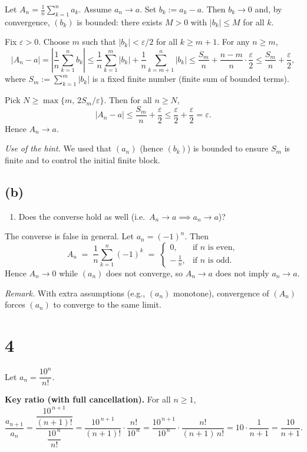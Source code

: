 \documentclass[12pt,a4paper]{article}
\theoremstyle{definition}
\theoremstyle{remark}
\begin{document}
Let \(A_n=\frac{1}{n}\sum_{k=1}^n a_k\). Assume \(a_n \to a\). Set \(b_k:=a_k-a\). Then \(b_k \to 0\) and, by convergence, \((b_k)\) is bounded: there exists \(M>0\) with \(|b_k|\le M\) for all \(k\).

Fix \(\varepsilon>0\). Choose \(m\) such that \(|b_k|<\varepsilon/2\) for all \(k\ge m+1\). For any \(n\ge m\),
\[
|A_n-a|
= \left|\frac{1}{n}\sum_{k=1}^n b_k\right|
\le \frac{1}{n}\sum_{k=1}^m |b_k| + \frac{1}{n}\sum_{k=m+1}^n |b_k|
\le \frac{S_m}{n} + \frac{n-m}{n}\cdot \frac{\varepsilon}{2}
\le \frac{S_m}{n} + \frac{\varepsilon}{2},
\]
where \(S_m:=\sum_{k=1}^m |b_k|\) is a fixed finite number (finite sum of bounded terms).

Pick \(N \ge \max\{m,\, 2S_m/\varepsilon\}\). Then for all \(n\ge N\),
\[
|A_n-a| \le \frac{S_m}{n} + \frac{\varepsilon}{2} \le \frac{\varepsilon}{2} + \frac{\varepsilon}{2} = \varepsilon.
\]
Hence \(A_n \to a\).

\emph{Use of the hint.} We used that \((a_n)\) (hence \((b_k)\)) is bounded to ensure \(S_m\) is finite and to control the initial finite block.

\subsection*{(b)}
\begin{enumerate}
  \item Does the converse hold as well (i.e.\ $A_n \to a \implies a_n \to a$)?
\end{enumerate}

The converse is false in general. Let $a_n = (-1)^n$. Then
\[
A_n \;=\; \frac{1}{n}\sum_{k=1}^n (-1)^k
\;=\;
\begin{cases}
0, & \text{if $n$ is even},\\[2pt]
-\,\frac{1}{n}, & \text{if $n$ is odd}.
\end{cases}
\]
Hence $A_n \to 0$ while $(a_n)$ does not converge, so $A_n \to a$ does not imply $a_n \to a$.

\textit{Remark.} With extra assumptions (e.g., $(a_n)$ monotone), convergence of $(A_n)$ forces $(a_n)$ to converge to the same limit.



\section*{4}
Let $a_n=\dfrac{10^n}{n!}$.

\textbf{Key ratio (with full cancellation).} For all $n\ge 1$,
\[
\frac{a_{n+1}}{a_n}
=\frac{\dfrac{10^{\,n+1}}{(n+1)!}}{\dfrac{10^{\,n}}{n!}}
=\frac{10^{\,n+1}}{(n+1)!}\cdot\frac{n!}{10^{\,n}}
=\frac{10^{\,n+1}}{10^{\,n}}\cdot\frac{n!}{(n+1)\,n!}
=10\cdot\frac{1}{n+1}
=\frac{10}{n+1}.
\]
\end{document}

